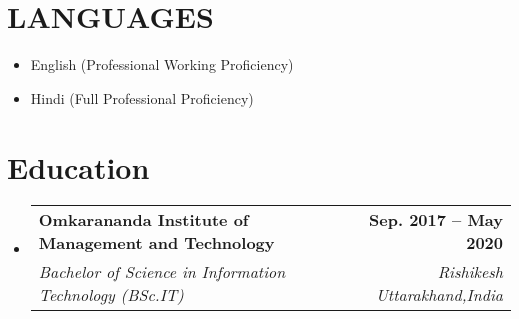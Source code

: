 \documentclass[letterpaper,11pt]{article}
\makeatletter
\newcommand{\resumeItem}[1]{
  \item\small{
    {#1 \vspace{-2pt}}
  }
}
\newcommand{\resumeSubheading}[4]{
  \vspace{-2pt}\item
    \begin{tabular*}{1.0\textwidth}[t]{l@{\extracolsep{\fill}}r}
      \textbf{#1} & \textbf{\small #2} \\
      \textit{\small#3} & \textit{\small #4} \\
    \end{tabular*}\vspace{-7pt}
}
\newcommand{\resumeSubHeadingListStart}{\begin{itemize}[leftmargin=0.0in, label={}]}
\newcommand{\resumeSubHeadingListEnd}{\end{itemize}}
\newcommand{\resumeItemListStart}{\begin{itemize}}
\newcommand{\resumeItemListEnd}{\end{itemize}\vspace{-5pt}}
\makeatother
\begin{document}
\section{LANGUAGES}
    \resumeSubHeadingListStart
        \resumeItemListStart
            \resumeItem{English (Professional Working Proficiency)}
            \resumeItem{Hindi (Full Professional Proficiency)}
        \resumeItemListEnd
    \resumeSubHeadingListEnd
\section{Education}
  \resumeSubHeadingListStart
    \resumeSubheading
      {Omkarananda Institute of Management and Technology}{Sep. 2017 -- May 2020}
      {Bachelor of Science in Information Technology (BSc.IT)}{Rishikesh Uttarakhand,India}
  \resumeSubHeadingListEnd
\end{document}
